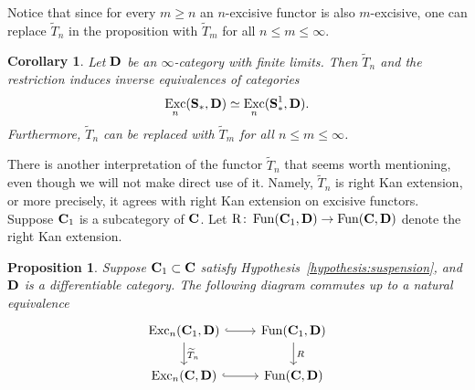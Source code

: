\documentclass[psamsfonts]{amsart}
\theoremstyle{plain}
\newtheorem{cor}[thm]{Corollary}
\newtheorem{prop}[thm]{Proposition}
\theoremstyle{definition}
\theoremstyle{remark}
\newcommand{\catname}[1]{{\normalfont\textbf{#1}}}
\newcommand{\spaces}{\catname{S}_*}
\newcommand{\connected}{\spaces^{1}}
\newcommand{\rkan}{\mathrm{R}}
\DeclareMathOperator{\fun}{Fun}
\DeclareMathOperator{\exc}{Exc}
\begin{document}
Notice that since for every $m\ge n$ an $n$-excisive functor is also $m$-excisive, one can replace $\widetilde T_n$ in the proposition with $\widetilde T_m$ for all $n \le m\le \infty$. 
\begin{cor}\label{cor:connected}
Let $\catname{D}$ be an $\infty$-category with finite limits. Then $\widetilde T_n$ and the restriction induces inverse equivalences of categories
\[
\exc_n(\spaces, \catname{D})\simeq \exc_n(\connected, \catname{D}).
\]
Furthermore, $\widetilde T_n$ can be replaced with $\widetilde T_m$ for all $n\le m \le \infty$.
\end{cor}
There is another interpretation of the functor $\widetilde T_n$ that seems worth mentioning, even though we will not make direct use of it. Namely, $\widetilde T_n$ is right Kan extension, or more precisely, it agrees with right Kan extension on excisive functors.
Suppose $\catname{C}_1$ is a subcategory of $\catname{C}$. Let $\rkan\colon \fun(\catname{C}_1, \catname{D}) \to \fun(\catname{C}, \catname{D})$ denote the right Kan extension.
\begin{prop}\label{prop:right Kan}
Suppose $\catname{C}_1\subset \catname{C}$ satisfy Hypothesis~\ref{hypothesis:suspension}, and $\catname{D}$ is a differentiable category. The following diagram commutes up to a natural equivalence
\[\begin{tikzcd}
	{\exc_n(\catname{C}_1, \catname{D})} & {\fun(\catname{C}_1, \catname{D})} \\
	{\exc_n(\catname{C}, \catname{D})} & {\fun(\catname{C}, \catname{D})}
	\arrow[hook, from=1-1, to=1-2]
	\arrow["{\widetilde T_n}", from=1-1, to=2-1]
	\arrow["R", from=1-2, to=2-2]
	\arrow[hook, from=2-1, to=2-2]
\end{tikzcd}\]
\end{prop}
\end{document}
